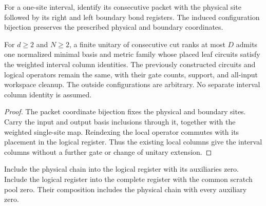 \begin{definition}
    \label{def:mpu_actual_leaf_coordinates}
    \leanok
    For a one-site interval, identify its consecutive packet with
    the physical site followed by its right and left boundary bond
    registers. The induced configuration bijection preserves the
    prescribed physical and boundary coordinates.
\end{definition}

\begin{lemma}
    \label{thm:mpu_actual_leaf_columns}
    \leanok
    For $d\geq2$ and $N\geq2$, a finite unitary of consecutive cut
    ranks at most $D$ admits one normalized minimal basis and metric
    family whose placed leaf circuits satisfy the weighted interval
    column identities. The previously constructed circuits and logical
    operators remain the same, with their gate counts, support,
    and all-input workspace cleanup. The outside configurations are
    arbitrary. No separate interval column identity is assumed.
\end{lemma}
\begin{proof}\leanok
    The packet coordinate bijection fixes the physical and
    boundary sites. Carry the input and output basis inclusions
    through it, together with the weighted single-site map. Reindexing
    the local operator commutes with its placement in the logical
    register. Thus the existing local columns give the interval
    columns without a further gate or change of unitary extension.
\end{proof}

\begin{definition}
    \label{def:mpu_actual_root_inclusions}
    \leanok
    Include the physical chain into the logical register with its
    auxiliaries zero. Include the logical register into the complete
    register with the common scratch pool zero. Their composition
    includes the physical chain with every auxiliary zero.
\end{definition}

